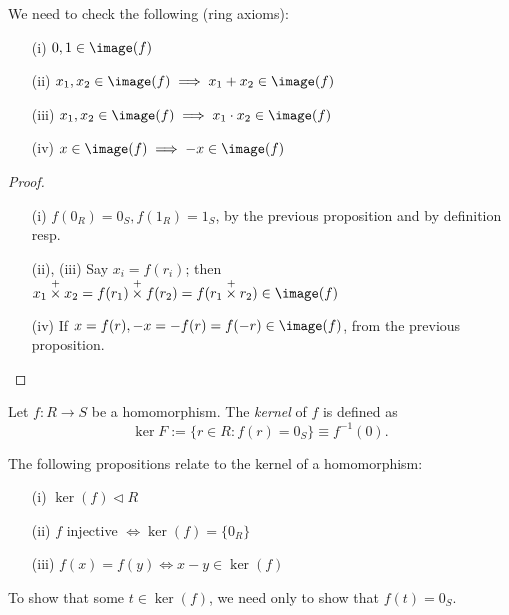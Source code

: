 \documentclass[12pt,oneside]{article}
\begin{document}
\begin{remark}
  We need to check the following (ring axioms):
  \begin{enumerate}
    \item[(i)] $0, 1 \in \image (f)$
    \item[(ii)] $x_1, x_2 \in \image (f) \implies x_1 + x_2 \in \image(f)$
    \item[(iii)] $x_1, x_2 \in \image (f) \implies x_1 \cdot x_2 \in \image(f)$
    \item[(iv)] $x \in \image (f) \implies -x \in \image (f)$
  \end{enumerate}
\end{remark}
\begin{proof}
 \begin{enumerate}
  \item[(i)] $f(0_R) = 0_S, f(1_R) = 1_S$, by the previous proposition and by definition resp.
  \item[(ii), (iii)] Say $x_i = f(r_i)$; then $x_1 \overset{+}{\times} x_2 = f(r_1 ) \overset{+}{\times} f(r_2) = f(r_1 \overset{+}{\times} r_2) \in \image (f)$
  \item[(iv)] If $x = f(r), -x = -f(r) = f(-r) \in \image(f)$, from the previous proposition.
 \end{enumerate}
\end{proof}
\begin{definition}[Kernel]
  Let $f: R \to S$ be a homomorphism. The \emph{kernel} of $f$ is defined as \[
  \ker{F} := \{r \in R : f(r) = 0_S\} \equiv f^{-1}(0).  
  \]
\end{definition}

\begin{proposition}
  The following propositions relate to the kernel of a homomorphism:
  \begin{itemize}
    \item[(i)] $\ker (f) \triangleleft R$
    \item[(ii)] $f $ injective $\iff \ker (f) = \{0_R\}$
    \item[(iii)] $f(x) = f(y) \iff x - y \in \ker (f)$
  \end{itemize}
\end{proposition}

\begin{remark}
  To show that some $t \in \ker (f)$, we need only to show that $f(t) = 0_S$.
\end{remark}
\end{document}

